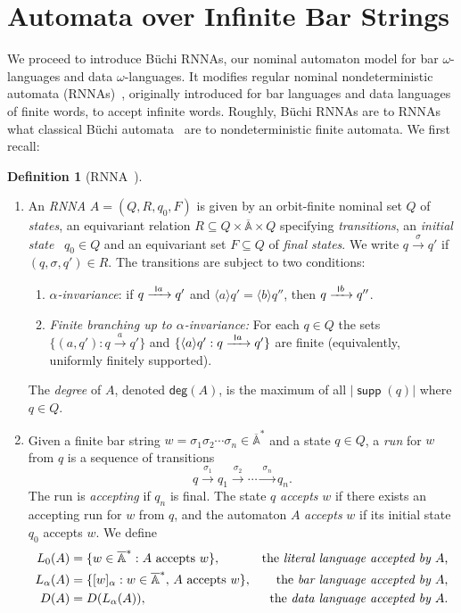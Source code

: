 \documentclass[final,a4paper,UKenglish,thm-restate,autoref,numberwithinsect]{lipics-v2021}
\newcommand{\scriptmidmid}{\hspace{0.2ex}{\rule[-0.1ex]{0.6pt}{1.1ex}}\hspace{0.2ex}}
\newcommand{\compr}{:}
\newcommand{\scriptnew}[1]{{\scriptmidmid}#1}
\newcommand{\degree}{\mathsf{deg}}
\newcommand{\barA}{\overline{\names}}
\numberwithin{equation}{section}
\newcommand{\xto}[1]{\xrightarrow{~#1~}}
\newcommand{\seq}{\subseteq}
\newcommand{\braket}[1]{\langle #1 \rangle}
\newcommand{\+}[1]{\mathcal{#1}\xspace}
\newcommand{\names}{\mathbb{A}}
\DeclareMathOperator{\supp}{\mathsf{supp}} %
\theoremstyle{definition}
\newtheorem{defn}[theorem]{Definition}
\begin{document}
\section{Automata over Infinite Bar Strings}\label{sec:rnna}

We proceed to introduce {Büchi RNNAs}, our nominal automaton model for bar $\omega$-languages and data $\omega$-languages. It modifies regular nominal nondeterministic automata
(RNNAs)~\cite{SchroderEA17}, originally introduced for bar languages and data languages of finite words, to accept infinite words. Roughly, Büchi RNNAs are to RNNAs what classical Büchi automata~\cite{GraedelThomasWilke02} are to nondeterministic finite automata. We first recall:
%
\begin{defn}[RNNA~\cite{SchroderEA17}]
\begin{enumerate}
\item  An \emph{RNNA} $A=(Q,R,q_0,F)$ is given by an orbit-finite nominal set $Q$
  of \emph{states}, an equivariant relation
  $R\seq Q\times \barA \times Q$ specifying \emph{transitions}, an
  \emph{initial state}~ $q_0\in Q$ and an equivariant set $F\seq Q$ of
  \emph{final states}. We write $q\xto{\sigma}q'$ if
  $(q,\sigma,q')\in R$. The transitions are subject to two conditions:
  \begin{enumerate}[(1)]
  \item \emph{$\alpha$-invariance}: if $q\xto{\scriptnew a}q'$ and
    $\braket{a} q'=\braket{b} q''$, then $q\xto{\scriptnew b}q''$.
    
  \item \emph{Finite branching up to $\alpha$-invariance:} For each $q\in Q$ the sets $\{ (a,q') \compr q\xto{a}q'\}$ and
    $\{ \braket{a} q' \compr q\xto{\scriptnew a} q' \}$ are finite (equivalently, uniformly finitely supported).
  \end{enumerate}
  The \emph{degree} of $A$, denoted $\degree(A)$, is the maximum of
  all $|\supp(q)|$ where $q\in Q$.
\item  Given a finite bar string
    $w=\sigma_1\sigma_2\cdots \sigma_n\in \barA^*$ and a state $q\in Q$, a \emph{run} for
    $w$ from $q$ is a sequence of transitions 
    \[
      q\xto{\sigma_1}q_1\xto{\sigma_2}\cdots \xto{\sigma_n}q_n.
    \]
    The run is \emph{accepting} if $q_n$ is final. The state $q$ \emph{accepts} $w$ if there exists an accepting run for $w$ from $q$, and the automaton $A$ \emph{accepts} $w$ if its initial state $q_0$ accepts $w$.
    We define
    \begin{align*}
      L_0(A)
      & = \{w\in \barA^*\compr \text{$A$ accepts $w$}\},
      & \text{the \emph{literal language accepted by $A$},}
      \\
      L_{\alpha}(A)
      & = \{ [w]_\alpha \compr w\in \barA^*, \, \text{$A$ accepts $w$} \},
      & \text{the \emph{bar language accepted by $A$},}
      \\
      D(A)
      & = D(L_{\alpha}(A)),& \text{the \emph{data language accepted by $A$}}. 
    \end{align*}
\end{enumerate}
\end{defn}
\end{document}
